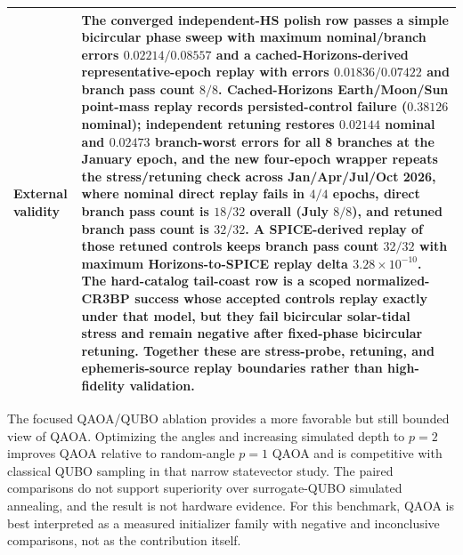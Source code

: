 \documentclass[preprint,12pt]{elsarticle}
\begin{document}
\begin{table}[t]
{\begin{tabular}{p{}p{}}
External validity & The converged independent-HS polish row passes a simple bicircular phase sweep with maximum nominal/branch errors $0.02214/0.08557$ and a cached-Horizons-derived representative-epoch replay with errors $0.01836/0.07422$ and branch pass count $8/8$. Cached-Horizons Earth/Moon/Sun point-mass replay records persisted-control failure ($0.38126$ nominal); independent retuning restores $0.02144$ nominal and $0.02473$ branch-worst errors for all 8 branches at the January epoch, and the new four-epoch wrapper repeats the stress/retuning check across Jan/Apr/Jul/Oct 2026, where nominal direct replay fails in $4/4$ epochs, direct branch pass count is $18/32$ overall (July $8/8$), and retuned branch pass count is $32/32$. A SPICE-derived replay of those retuned controls keeps branch pass count $32/32$ with maximum Horizons-to-SPICE replay delta $3.28\times10^{-10}$. The hard-catalog tail-coast row is a scoped normalized-CR3BP success whose accepted controls replay exactly under that model, but they fail bicircular solar-tidal stress and remain negative after fixed-phase bicircular retuning. Together these are stress-probe, retuning, and ephemeris-source replay boundaries rather than high-fidelity validation. \\
\bottomrule
\end{tabular}}
\end{table}

The focused QAOA/QUBO ablation provides a more favorable but still bounded view of QAOA. Optimizing the angles and increasing simulated depth to $p=2$ improves QAOA relative to random-angle $p=1$ QAOA and is competitive with classical QUBO sampling in that narrow statevector study. The paired comparisons do not support superiority over surrogate-QUBO simulated annealing, and the result is not hardware evidence. For this benchmark, QAOA is best interpreted as a measured initializer family with negative and inconclusive comparisons, not as the contribution itself.
\end{document}
